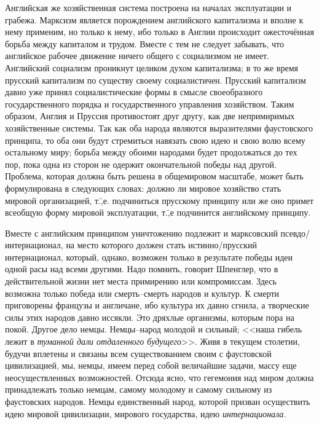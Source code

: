 Английская же хозяйственная система построена на началах эксплуатации и грабежа. Марксизм является порождением английского капитализма и вполне к нему применим, но только к нему, ибо только в Англии происходит ожесточённая борьба между капиталом и трудом. Вместе с тем не следует забывать, что английское рабочее движение ничего общего с социализмом не имеет. Английский социализм проникнут целиком духом капитализма; в то же время прусский капитализм по существу своему социалистичен. Прусский капитализм давно уже принял социалистические формы в смысле своеобразного государственного порядка и государственного управления хозяйством. Таким образом, Англия и Пруссия противостоят друг другу, как две непримиримых хозяйственные системы. Так как оба народа являются выразителями фаустовского принципа, то оба они будут стремиться навязать свою идею и свою волю всему остальному миру; борьба между обоими народами будет продолжаться до тех пор, пока одна из сторон не одержит окончательной победы над другой. Проблема, которая должна быть решена в общемировом масштабе, может быть формулирована в следующих словах: должно ли мировое хозяйство стать мировой организацией, т.\=,е. подчиниться прусскому принципу или же оно примет всеобщую форму мировой эксплуатации, т.\=,е подчинится английскому принципу.

Вместе с английским принципом уничтожению подлежит и марксовский псевдо\-/интернационал, на место которого должен стать истинно\-/прусский интернационал, который, однако, возможен только в результате победы идеи одной расы над всеми другими. Надо помнить, говорит Шпенглер, что в действительной жизни нет места примирению или компромиссам. Здесь возможна только победа или смерть\---смерть народов и культур. К смерти приговорены французы и англичане, ибо культура их давно сгнила, а творческие силы этих народов давно иссякли. Это дряхлые организмы, которым пора на покой. Другое дело немцы. Немцы\---народ молодой и сильный; <<наша гибель лежит в \emph{туманной дали отдаленного будущего}>>. Живя в текущем столетии, будучи вплетены и связаны всем существованием своим с фаустовской цивилизацией, мы, немцы, имеем перед собой величайшие задачи, массу еще неосуществленных возможностей. Отсюда ясно, что гегемония над миром должна принадлежать только немцам, самому молодому и самому сильному из фаустовских народов. Немцы единственный народ, которой призван осуществить идею мировой цивилизации, мирового государства, идею \emph{интернационала.}

